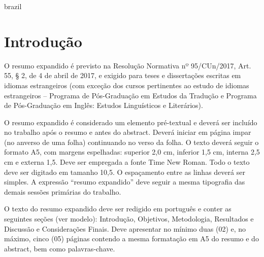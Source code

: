 \makeatletter
\ifenglish

  \cleardoublepage

  \begin{otherlanguage*}{brazil}
    \setlength{\parskip}{0.2cm}
    \setlength{\parindent}{0.0cm}
    \selectfont

    \section*{Introdução}
    O resumo expandido é previsto na Resolução Normativa nº 95/CUn/2017,
    Art. 55, § 2, de 4 de abril de 2017, e exigido para teses e dissertações
    escritas em idiomas estrangeiros (com exceção dos cursos pertinentes ao
    estudo de idiomas estrangeiros – Programa de Pós-Graduação em Estudos da
    Tradução e Programa de Pós-Graduação em Inglês: Estudos Linguísticos e
    Literários).

    O resumo expandido é considerado um elemento pré-textual e deverá ser
    incluído no trabalho após o resumo e antes do abstract. Deverá iniciar
    em página impar (no anverso de uma folha) continuando no verso da folha.
    O texto deverá seguir o formato A5, com margens espelhadas: superior 2,0
    cm, inferior 1,5 cm, interna 2,5 cm e externa 1,5. Deve ser empregada a
    fonte Time New Roman.  Todo o texto deve ser digitado em tamanho 10,5. O
    espaçamento entre as linhas deverá ser simples. A expressão “resumo
    expandido” deve seguir a mesma tipografia das demais sessões primárias
    do trabalho.

    O texto do resumo expandido deve ser redigido em português e conter as
    seguintes seções (ver modelo): Introdução, Objetivos, Metodologia,
    Resultados e Discussão e Considerações Finais.  Deve apresentar no
    mínimo duas (02) e, no máximo, cinco (05) páginas contendo a mesma
    formatação em A5 do resumo e do abstract, bem como palavras-chave.
    \englishword{}


\end{otherlanguage*}

